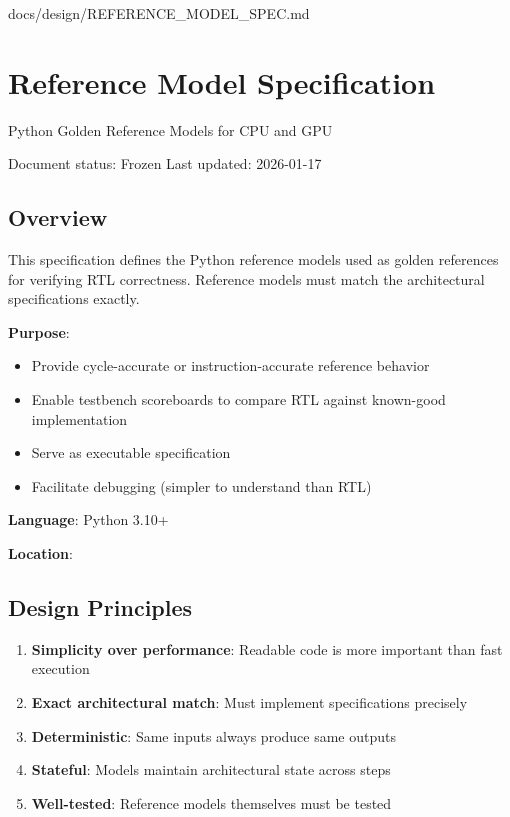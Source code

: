 \begin{relocated}{docs/design/REFERENCE_MODEL_SPEC.md}
\section{Reference Model Specification}\label{ds:ch:reference-model}

Python Golden Reference Models for CPU and GPU

Document status: Frozen Last updated: 2026-01-17

\subsection{Overview}\label{ds:ch:reference-model:overview}

This specification defines the Python reference models used as golden
references for verifying RTL correctness. Reference models must match
the architectural specifications exactly.

\textbf{Purpose}:

\begin{itemize}
\tightlist
\item
  Provide cycle-accurate or instruction-accurate reference behavior
\item
  Enable testbench scoreboards to compare RTL against known-good
  implementation
\item
  Serve as executable specification
\item
  Facilitate debugging (simpler to understand than RTL)
\end{itemize}

\textbf{Language}: Python 3.10+

\textbf{Location}: 

\subsection{Design Principles}\label{ds:ch:reference-model:design-principles}

\begin{enumerate}
\def\labelenumi{\arabic{enumi}.}
\tightlist
\item
  \textbf{Simplicity over performance}: Readable code is more important
  than fast execution
\item
  \textbf{Exact architectural match}: Must implement specifications
  precisely
\item
  \textbf{Deterministic}: Same inputs always produce same outputs
\item
  \textbf{Stateful}: Models maintain architectural state across steps
\item
  \textbf{Well-tested}: Reference models themselves must be tested
\end{enumerate}


\end{relocated}
